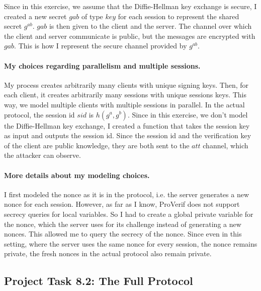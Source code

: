\documentclass[12pt,a4paper]{article}
\begin{document}
Since in this exercise, we assume that the Diffie-Hellman key exchange is secure, I created a 
new secret $gab$ of type $key$ for each session to represent the shared secret $g^{ab}$. $gab$ 
is then given to the client and the server. The channel over which the client and server 
communicate is public, but the messages are encrypted with $gab$. This is how I represent the 
secure channel provided by $g^{ab}$.

\paragraph{My choices regarding parallelism and multiple sessions.}

My process creates arbitrarily many clients with unique signing keys. Then, for each client, it 
creates arbitrarily many sessions with unique sessions keys. This way, we model multiple clients 
with multiple sessions in parallel. In the actual protocol, the session id $sid$ is $h(g^a,g^b)$. 
Since in this exercise, we don't model the Diffie-Hellman key exchange, I created a function 
that takes the session key as input and outputs the session id. Since the session id and the 
verification key of the client are public knowledge, they are both sent to the $att$ channel, which 
the attacker can observe.

\paragraph{More details about my modeling choices.}

I first modeled the nonce as it is in the protocol, i.e. the server generates a new nonce for each 
session. However, as far as I know, ProVerif does not support secrecy queries for local variables. 
So I had to create a global private variable for the nonce, which the server uses for its challenge 
instead of generating a new nonces. This allowed me to query the secrecy of the nonce. Since even 
in this setting, where the server uses the same nonce for every session, the nonce remains private, 
the fresh nonces in the actual protocol also remain private.

\subsection*{Project Task 8.2: The Full Protocol}
\end{document}
